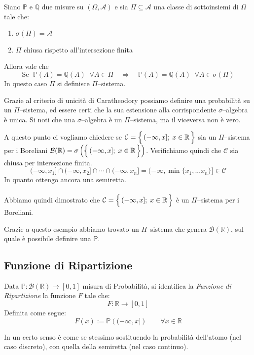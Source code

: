 \begin{teorema}
\label{th:caratheodory}
Siano $\mathbb{P} $ e $\mathbb{Q}$ due misure su $(\Omega, \mathcal{A})$ e sia $\Pi\subseteq\mathcal{A}$ una classe di sottoinsiemi di $\Omega$ tale che:
\begin{enumerate}
    \item $\sigma(\Pi) = \mathcal{A}$
    \item $\Pi$ chiusa rispetto all'intersezione finita
\end{enumerate}
    Allora vale che
    \[\text{Se }\; \mathbb{P}(A) = \mathbb{Q}(A)\;\; \forall A\in\Pi \quad\Rightarrow\quad \mathbb{P}(A)=\mathbb{Q}(A)\;\;\forall A\in \sigma(\Pi)\]
    In questo caso $\Pi$ si definisce $\Pi$--sistema.
\end{teorema}

Grazie al criterio di unicità di Caratheodory possiamo definire una probabilità su un $\Pi$--sistema, ed essere certi che la sua estensione alla corrispondente $\sigma$--algebra è unica. Si noti che una $\sigma$--algebra è un $\Pi$--sistema, ma il viceversa non è vero. 

\begin{esempio}[\faWarning]
    A questo punto ci vogliamo chiedere se $\mathcal{C}=\Bigl\{\,(-\infty, x]; \; x\in\mathbb{R}\,\Bigr\}$ sia un $\Pi$--sistema per i Boreliani $\mathcal{B}(\mathbb{R}) = \sigma\left(\Bigl\{\,(-\infty, x]; \; x\in\mathbb{R}\,\Bigr\}\right)$. Verifichiamo quindi che $\mathcal{C}$ sia chiusa per intersezione finita.
    \[(-\infty, x_1]\cap(-\infty, x_2]\cap\cdots\cap(-\infty, x_n] = (-\infty, \min\{x_1, ...x_n\}]\in \mathcal{C}\]
    In quanto ottengo ancora una semiretta.\\
    \\
    Abbiamo quindi dimostrato che $\mathcal{C}=\Bigl\{\,(-\infty, x]; \; x\in\mathbb{R}\,\Bigr\}$ è un $\Pi$--sistema per i Boreliani.
\end{esempio}
Grazie a questo esempio abbiamo trovato un $\Pi$--sistema che genera $\mathcal{B}(\mathbb{R})$, sul quale è possibile definire una $\mathbb{P}$.

\subsection{Funzione di Ripartizione}
\begin{definizione}
    Data $\mathbb{P}:\mathcal{B}(\mathbb{R})\rightarrow[0, 1]$ misura di Probabilità, si identifica la \textit{Funzione di Ripartizione} la funzione $F$ tale che:
    \[F:\mathbb{R}\rightarrow[0, 1]\]
    Definita come segue:
    \[F(x) := \mathbb{P}\left((-\infty, x]\right)\qquad \forall x\in\mathbb{R}\]
\end{definizione}
In un certo senso è come se stessimo sostituendo la probabilità dell'atomo (nel caso discreto), con quella della semiretta (nel caso continuo).

